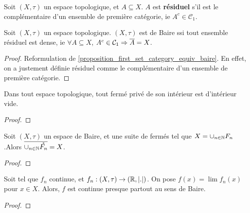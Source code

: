\begin{definition}
	Soit $(X, \tau)$ un espace topologique, et $A \subseteq X$.
	$A$ est \textbf{résiduel} s'il est le complémentaire d'un ensemble de
	première catégorie, ie $A^{c} \in \mathcal{C}_{1}$.
\end{definition}

\begin{proposition}
	\label{proposition_residual_equiv_baire}
	Soit $(X, \tau)$ un espace topologique.
	$(X, \tau)$ est de Baire ssi tout ensemble résiduel est dense, ie $\forall A
	\subseteq X$, $A^{c} \in \mathcal{C}_{1} \Rightarrow \overline{A} = X$.
\end{proposition}

\begin{proof}
	Reformulation de \ref{proposition_first_set_category_equiv_baire}. En effet,
	on a justement définie résiduel comme le complémentaire d'un ensemble de
	première catégorie.
\end{proof}

\begin{proposition}
	Dans tout espace topologique, tout fermé privé de son intérieur est
	d'intérieur vide.
\end{proposition}

\begin{proof}
	
\end{proof}

 \begin{proposition}
	Soit $(X, \tau)$ un espace de Baire, et  une
	suite de fermés tel que $X = \displaystyle\cup_{n \in \mathbb{N}}F_{n}$.Alors
	$\displaystyle\overline{\cup_{n \in \mathbb{N}}\mathring{F_{n}}} = X$.
\end{proposition}

\begin{proof}
	
\end{proof}

\begin{theorem}
	\label{first_category_set_theorem_continued_function}
	Soit  tel que $f_{n}$ continue, et $f_{n} :
	(X, \tau) \rightarrow (\mathbb{R}, |.|)$.
	On pose $f(x) = \lim f_{n}(x)$ pour $x \in X$. Alors, $f$ est continue
	presque partout au sens de Baire.
\end{theorem}

\begin{proof}
	
\end{proof}

